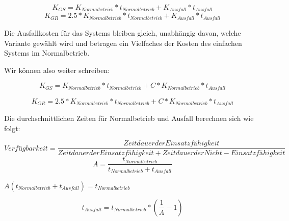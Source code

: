 \documentclass[a4paper]{article}
\begin{document}
\begin{equation*}
K_{\mathit{GS}}=K_{\mathit{Normalbetrieb}}\ast
t_{\mathit{Normalbetrieb}}+K_{\mathit{Ausfall}}\ast
t_{\mathit{Ausfall}}
\end{equation*}
\begin{equation*}
K_{\mathit{GR}}=2.5\ast K_{\mathit{Normalbetrieb}}\ast
t_{\mathit{Normalbetrieb}}+K_{\mathit{Ausfall}}\ast
t_{\mathit{Ausfall}}
\end{equation*}

\bigskip

Die Ausfallkosten f\"ur das Systems bleiben gleich, unabh\"angig davon,
welche Variante gew\"ahlt wird und betragen ein Vielfaches der Kosten
des einfachen Systems im Normalbetrieb.

Wir k\"onnen also weiter schreiben:


\bigskip

\begin{equation*}
K_{\mathit{GS}}=K_{\mathit{Normalbetrieb}}\ast
t_{\mathit{Normalbetrieb}}+C\ast K_{\mathit{Normalbetrieb}}\ast
t_{\mathit{Ausfall}}
\end{equation*}

\bigskip

\begin{equation*}
K_{\mathit{GR}}=2.5\ast K_{\mathit{Normalbetrieb}}\ast
t_{\mathit{Normalbetrieb}}+C\ast K_{\mathit{Normalbetrieb}}\ast
t_{\mathit{Ausfall}}
\end{equation*}

\bigskip

Die durchschnittlichen Zeiten f\"ur Normalbetrieb und Ausfall berechnen sich wie folgt:


\bigskip

\begin{equation*}
\mathit{Verf\text{\"u}gbarkeit}=\frac{\mathit{Zeitdauer}\mathit{der}\mathit{Einsatzf\text{\"a}higkeit}}{\mathit{Zeitdauer}\mathit{der}\mathit{Einsatzf\text{\"a}higkeit}+\mathit{Zeitdauer}\mathit{der}\mathit{Nicht}-\mathit{Einsatzf\text{\"a}higkeit}}
\end{equation*}
\begin{equation*}
A=\frac{t_{\mathit{Normalbetrieb}}}{t_{\mathit{Normalbetrieb}}+t_{\mathit{Ausfall}}}
\end{equation*}

$A(t_{\mathit{Normalbetrieb}}+t_{\mathit{Ausfall}})=t_{\mathit{Normalbetrieb}}$


\begin{equation*}
t_{\mathit{Ausfall}}=t_{\mathit{Normalbetrieb}}\ast (\frac{1}{A}-1)
\end{equation*}
\end{document}
